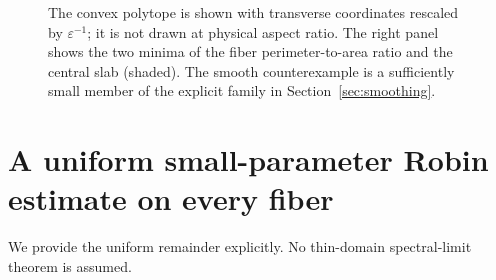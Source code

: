\documentclass[11pt,a4paper]{article}
\theoremstyle{remark}
\begin{document}
\begin{figure}[tb]
\caption{The convex polytope is shown with transverse coordinates rescaled by $\varepsilon^{-1}$; it is not drawn at physical aspect ratio. The right panel shows the two minima of the fiber perimeter-to-area ratio and the central slab (shaded). The smooth counterexample is a sufficiently small member of the explicit family in Section~\ref{sec:smoothing}.}
\label{fig:domain}
\end{figure}

\section{A uniform small-parameter Robin estimate on every fiber}
We provide the uniform remainder explicitly. No thin-domain spectral-limit theorem is assumed.
\end{document}
